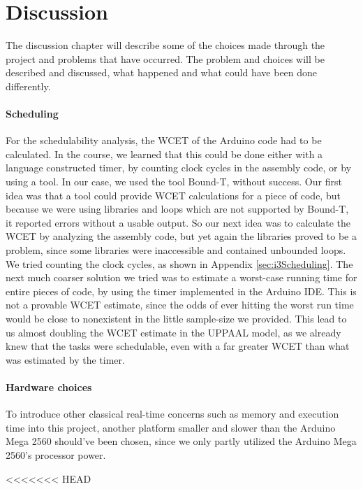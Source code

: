 \chapter{Discussion}
\label{chap:Discussion}
The discussion chapter will describe some of the choices made through the project and problems that have occurred. The problem and choices will be described and discussed, what happened and what could have been done differently. 


\subsubsection{Scheduling}
For the schedulability analysis, the WCET of the Arduino code had to be calculated. In the course, we learned that this could be done either with a language constructed timer, by counting clock cycles in the assembly code, or by using a tool. In our case, we used the tool Bound-T, without success. Our first idea was that a tool could provide WCET calculations for a piece of code, but because we were using libraries and loops which are not supported by Bound-T, it reported errors without a usable output. So our next idea was to calculate the WCET by analyzing the assembly code, but yet again the libraries proved to be a problem, since some libraries were inaccessible and contained unbounded loops. We tried counting the clock cycles, as shown in Appendix \ref{sec:i3Scheduling}. The next much coarser solution we tried was to estimate a worst-case running time for entire pieces of code, by using the timer implemented in the Arduino IDE. This is not a provable WCET estimate, since the odds of ever hitting the worst run time would be close to nonexistent in the little sample-size we provided. This lead to us almost doubling the WCET estimate in the UPPAAL model, as we already knew that the tasks were schedulable, even with a far greater WCET than what was estimated by the timer.


\subsubsection{Hardware choices}
To introduce other classical real-time concerns such as memory and execution time into this project, another platform smaller and slower than the Arduino Mega 2560 should’ve been chosen, since we only partly utilized the Arduino Mega 2560’s processor power. 

<<<<<<< HEAD

